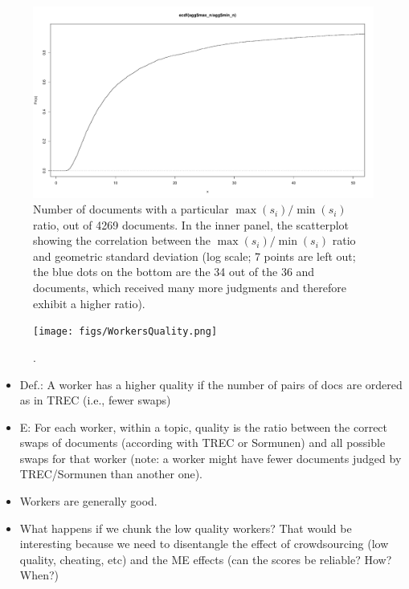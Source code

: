 \begin{figure}[tp]
  \centering
  \includegraphics[width=.9\linewidth,page=6]{figs/JudgeVariability.pdf}
  \caption{Number of documents with a particular
    $\max(s_i) / \min(s_i)$ ratio, out of 4269 documents. 
    In the inner panel, the scatterplot showing the correlation between the
    $\max(s_i) / \min(s_i)$ ratio and geometric standard deviation
    (log scale; 7
    points are left out; the blue dots on the bottom are the 34 out of
    the 36 \nkn and \hkh documents, which received many more judgments
    and therefore exhibit a higher ratio).
    \label{fig:judgeVariability}}
\end{figure}


\begin{figure}[tp]
  \centering
  \texttt{[image: figs/WorkersQuality.png]}
  \caption{.
    \label{fig:workersQuality}}
\end{figure}

\begin{itemize}
\item Def.: A worker has a higher quality if the number of pairs of
  docs
  are ordered as in TREC (i.e., fewer swaps)

\item E: For each worker, within a topic, quality is the ratio between
  the correct swaps of documents (according with TREC or Sormunen) and
  all possible swaps for that worker (note: a worker might have fewer
  documents judged by TREC/Sormunen than another one).

\item Workers are generally good. 
\item What happens if we chunk the low quality workers? 
  That would be interesting because we need to disentangle the effect
  of crowdsourcing (low quality, cheating, etc) and the ME effects
  (can the scores be reliable? 
  How? 
  When?)
\end{itemize}

